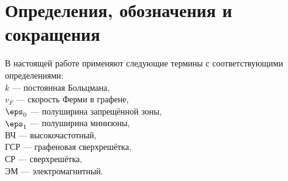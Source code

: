 \section*{Определения, обозначения и сокращения}
В настоящей работе применяют следующие термины с соответствующими определениями:\\
\( k \) --- постоянная Больцмана,\\
\( v_F \) --- скорость Ферми в графене,\\
\( \eps_0 \) --- полуширина запрещённой зоны,\\
\( \eps_1 \) --- полуширина минизоны,\\
ВЧ --- высокочастотный,\\
ГСР --- графеновая сверхрешётка,\\
СР --- сверхрешётка,\\
ЭМ --- электромагнитный.
